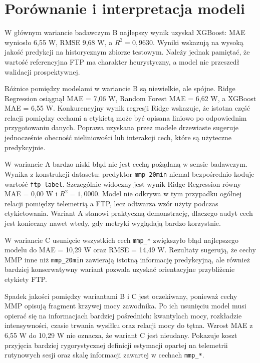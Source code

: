 \FloatBarrier
\section{Porównanie i interpretacja modeli}

W głównym wariancie badawczym B najlepszy wynik uzyskał XGBoost: MAE wyniosło 6{,}55 W, RMSE 9{,}68 W, a $R^2 = 0{,}9630$. Wyniki wskazują na wysoką jakość predykcji na historycznym zbiorze testowym. Należy jednak pamiętać, że wartość referencyjna FTP ma charakter heurystyczny, a model nie przeszedł walidacji prospektywnej.

Różnice pomiędzy modelami w wariancie B są niewielkie, ale spójne. Ridge Regression osiągnął MAE = 7{,}06 W, Random Forest MAE = 6{,}62 W, a XGBoost MAE = 6{,}55 W. Konkurencyjny wynik regresji Ridge wskazuje, że istotna część relacji pomiędzy cechami a etykietą może być opisana liniowo po odpowiednim przygotowaniu danych. Poprawa uzyskana przez modele drzewiaste sugeruje jednocześnie obecność nieliniowości lub interakcji cech, które są użyteczne predykcyjnie.

W wariancie A bardzo niski błąd nie jest cechą pożądaną w sensie badawczym. Wynika z konstrukcji datasetu: predyktor \texttt{mmp\_20min} niemal bezpośrednio koduje wartość \texttt{ftp\_label}. Szczególnie widoczny jest wynik Ridge Regression równy MAE = 0{,}00 W i $R^2 = 1{,}0000$. Model nie odkrywa w tym przypadku ogólnej relacji pomiędzy telemetrią a FTP, lecz odtwarza wzór użyty podczas etykietowania. Wariant A stanowi praktyczną demonstrację, dlaczego audyt cech jest konieczny nawet wtedy, gdy metryki wyglądają bardzo korzystnie.

W wariancie C usunięcie wszystkich cech \texttt{mmp\_*} zwiększyło błąd najlepszego modelu do MAE = 10{,}29 W oraz RMSE = 14{,}49 W. Rezultaty sugerują, że cechy MMP inne niż \texttt{mmp\_20min} zawierają istotną informację predykcyjną, ale również bardziej konserwatywny wariant pozwala uzyskać orientacyjne przybliżenie etykiety FTP.

Spadek jakości pomiędzy wariantami B i C jest oczekiwany, ponieważ cechy MMP opisują fragment krzywej mocy zawodnika. Po ich usunięciu model musi opierać się na informacjach bardziej pośrednich: kwantylach mocy, rozkładzie intensywności, czasie trwania wysiłku oraz relacji mocy do tętna. Wzrost MAE z 6{,}55 W do 10{,}29 W nie oznacza, że wariant C jest nieudany. Pokazuje koszt przyjęcia bardziej rygorystycznej definicji estymacji opartej na telemetrii rutynowych sesji oraz skalę informacji zawartej w cechach \texttt{mmp\_*}.

